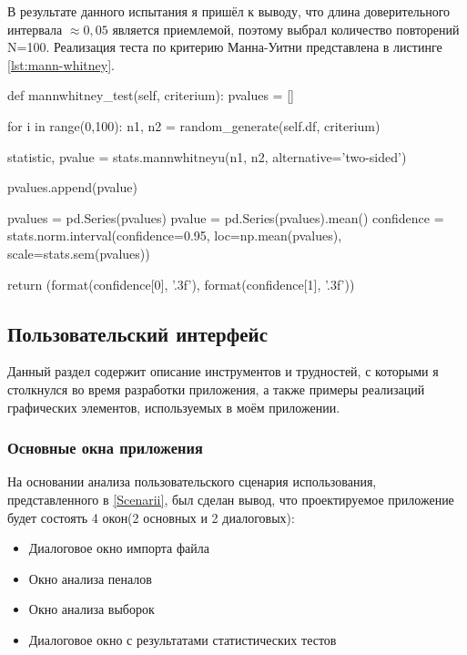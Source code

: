 В результате данного испытания я пришёл к выводу, что длина доверительного интервала $\approx 0,05$ является приемлемой, поэтому выбрал количество повторений N=100. Реализация теста по критерию Манна-Уитни представлена в листинге \ref{lst:mann-whitney}.

\begin{flushleft}
	 \label{lst:mann-whitney}
	\begin{MyCodes}
def mannwhitney_test(self, criterium):
	pvalues = []
	
	for i in range(0,100):
		n1, n2 = random_generate(self.df, criterium)
		
		statistic, pvalue = stats.mannwhitneyu(n1, n2, alternative='two-sided')
		
		pvalues.append(pvalue)
	
	pvalues = pd.Series(pvalues)
	pvalue = pd.Series(pvalues).mean()
	confidence = stats.norm.interval(confidence=0.95, loc=np.mean(pvalues),
		scale=stats.sem(pvalues))
	
	return (format(confidence[0], '.3f'), format(confidence[1], '.3f'))
	
	\end{MyCodes}
\end{flushleft}


\subsection{Пользовательский интерфейс}

Данный раздел содержит описание инструментов и трудностей, с которыми я столкнулся во время разработки приложения, а также примеры реализаций графических элементов, используемых в моём приложении.

\subsubsection{Основные окна приложения}

На основании анализа пользовательского сценария использования, представленного в \ref{Scenarii}, был сделан вывод, что проектируемое приложение будет состоять 4 окон(2 основных и 2 диалоговых):

\begin{itemize}
	\item Диалоговое окно импорта файла
	\item Окно анализа пеналов
	\item Окно анализа выборок
	\item Диалоговое окно с результатами статистических тестов 
\end{itemize}

